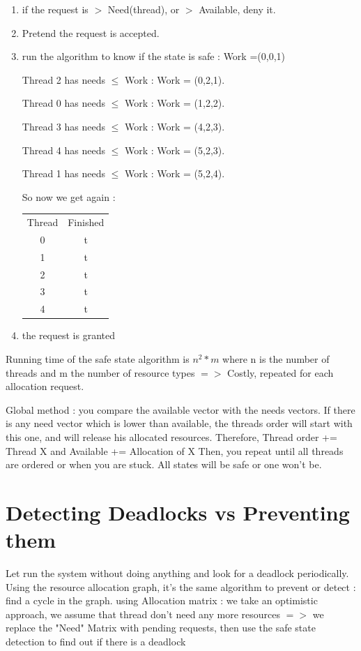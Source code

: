 \documentclass[a4paper,10pt]{article}
\begin{document}
\begin{enumerate}
  \item if the request is $>$ Need(thread), or $>$ Available, deny it.
  \item Pretend the request is accepted.
  \item run the algorithm to know if the state is safe : Work =(0,0,1)
  
Thread 2 has needs $\leq$ Work  : Work = (0,2,1).

Thread 0 has needs $\leq$ Work : Work = (1,2,2).

Thread 3 has needs $\leq$ Work : Work = (4,2,3).

Thread 4 has needs $\leq$ Work : Work = (5,2,3).

Thread 1 has needs $\leq$ Work : Work = (5,2,4).

So now we get again :

\begin{center}
    \begin{tabular}{cc}
      Thread & Finished\\
      0 & t\\
      1 & t\\
      2 & t\\
      3 & t\\
      4 & t\\
    \end{tabular}
  \end{center}
  
  \item the request is granted
\end{enumerate}

Running time of the safe state algorithm is $n^2*m$ where n is the number of threads and m the number of resource types $=>$ Costly, repeated for each allocation request.


Global method : you compare the available vector with the needs vectors.
If there is any need vector which is lower than available, the threads order will start with this one, and will release his allocated resources.
Therefore, Thread order += Thread X and Available += Allocation of X
Then, you repeat until all threads are ordered or when you are stuck.
All states will be safe or one won't be.

\section{Detecting Deadlocks vs Preventing them}

Let run the system without doing anything and look for a deadlock periodically.
Using the resource allocation graph, it's the same algorithm to prevent or detect : find a cycle in the graph.
using Allocation matrix : we take an optimistic approach, we assume that thread don't need any more resources $=>$ we replace the "Need" Matrix with pending requests, then use the safe state detection to find out if there is a deadlock
\end{document}
